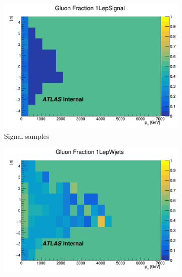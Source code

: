 


\begin{figure}[p]
    \centering
    \begin{subfigure}[b]{0.3\textwidth}
        \centering
        \includegraphics[width=\textwidth]{figures/QGfrac/GluonFrac2D_1LepSignal.png}
        \caption{Signal samples}
        \label{fig:GluonFracSignal}
    \end{subfigure}
    \hfill
    \begin{subfigure}[b]{0.3\textwidth}
        \centering
        \includegraphics[width=\textwidth]{figures/QGfrac/GluonFrac2D_1LepWjets.png}

\end{subfigure}
\end{figure}
